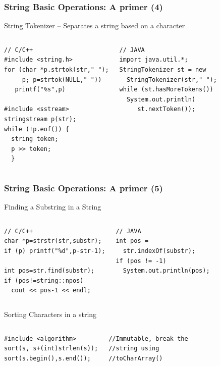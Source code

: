 \documentclass{beamer}
\begin{document}
\begin{frame}[fragile]
  \frametitle{String Basic Operations: A primer (4)}
  {\smaller
    \begin{block}{String Tokenizer -- Separates a string based on a character}
      \begin{columns}[T]
\begin{verbatim}
// C/C++
#include <string.h>
for (char *p.strtok(str," ");
     p; p=strtok(NULL," "))
   printf("%s",p)

#include <sstream>
stringstream p(str);
while (!p.eof()) {
  string token;
  p >> token;
  }
\end{verbatim}
\begin{verbatim}
// JAVA
import java.util.*;
StringTokenizer st = new
  StringTokenizer(str," ");
while (st.hasMoreTokens())
  System.out.println(
     st.nextToken());
\end{verbatim}
      \end{columns}
    \end{block}
    }
\end{frame}

\begin{frame}[fragile]
  \frametitle{String Basic Operations: A primer (5)}
  {\smaller
    \begin{block}{Finding a Substring in a String}
      \begin{columns}[T]
\begin{verbatim}
// C/C++
char *p=strstr(str,substr);
if (p) printf("%d",p-str-1);

int pos=str.find(substr);
if (pos!=string::npos)
  cout << pos-1 << endl;
\end{verbatim}
\begin{verbatim}
// JAVA
int pos =
  str.indexOf(substr);
if (pos != -1)
  System.out.println(pos);
\end{verbatim}
      \end{columns}
    \end{block}
    \begin{block}{Sorting Characters in a string}
      \begin{columns}[T]
\begin{verbatim}
#include <algorithm>
sort(s, s+(int)strlen(s));
sort(s.begin(),s.end());
\end{verbatim}
\begin{verbatim}
//Immutable, break the
//string using
//toCharArray()
\end{verbatim}
      \end{columns}
    \end{block}
  }
\end{frame}
\end{document}
